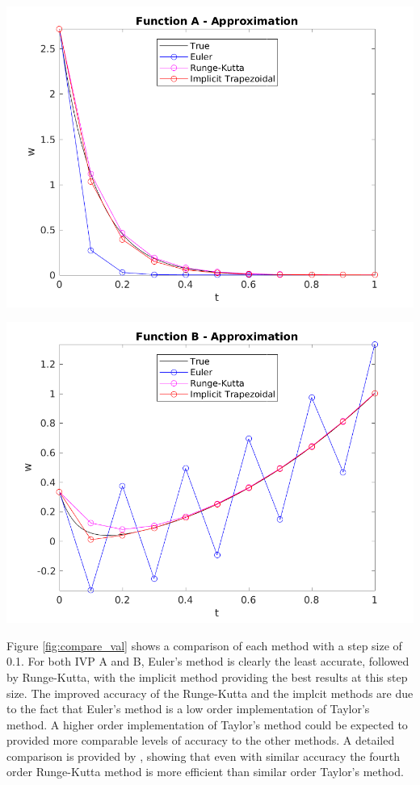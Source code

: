 \documentclass{article}
\begin{document}
\begin{center}
	\centering
    \begin{minipage}{0.5\textwidth}
        \centering
	    \includegraphics[width=1\textwidth]{../output/a_compare_val.png}
    \end{minipage}\hfill
    \begin{minipage}{0.5\textwidth}
        \centering
	    \includegraphics[width=1\textwidth]{../output/b_compare_val.png}
    \end{minipage}
 	\label{fig:compare_val}
\end{center}

Figure \ref{fig:compare_val} shows a comparison of each method with a step size of 0.1. For both IVP A and B, Euler's method is clearly the least accurate, followed by Runge-Kutta, with the implicit method providing the best results at this step size. The improved accuracy of the Runge-Kutta and the implcit methods are due to the fact that Euler's method is a low order implementation of Taylor's method. A higher order implementation of Taylor's method could be expected to provided more comparable levels of accuracy to the other methods. A detailed comparison is provided by \cite{burden2010}, showing that even with similar accuracy the fourth order Runge-Kutta method is more efficient than similar order Taylor's method. 
\end{document}
